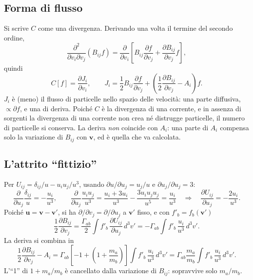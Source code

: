 \subsection{Forma di flusso}
Si scrive $C$ come una divergenza. Derivando una volta il termine del secondo ordine,
\begin{equation}
\frac{\partial^2}{\partial v_i\partial v_j}\left(B_{ij}f\right)=\frac{\partial}{\partial v_i}\left[B_{ij}\frac{\partial f}{\partial v_j}+\frac{\partial B_{ij}}{\partial v_j}f\right],
\end{equation}
quindi
\begin{equation}
C[f]=\frac{\partial J_i}{\partial v_i},\qquad J_i=\frac12B_{ij}\frac{\partial f}{\partial v_j}+\left(\frac12\frac{\partial B_{ij}}{\partial v_j}-A_i\right)f .
\end{equation}
$J_i$ è (meno) il flusso di particelle nello spazio delle velocità: una parte diffusiva, $\propto\partial f$, e una di deriva. Poiché $C$ è la divergenza di una corrente, e in assenza di sorgenti la divergenza di una corrente non crea né distrugge particelle, il numero di particelle si conserva. La deriva \emph{non} coincide con $A_i$: una parte di $A_i$ compensa solo la variazione di $B_{ij}$ con $\mathbf{v}$, ed è quella che va calcolata.

\subsection{L'attrito ``fittizio''}
Per $U_{ij}=\delta_{ij}/u-u_iu_j/u^3$, usando $\partial u/\partial u_j=u_j/u$ e $\partial u_j/\partial u_j=3$:
\begin{equation}
\frac{\partial}{\partial u_j}\frac{\delta_{ij}}{u}=-\frac{u_i}{u^3},\qquad
\frac{\partial}{\partial u_j}\frac{u_iu_j}{u^3}=\frac{u_i+3u_i}{u^3}-\frac{3u_iu_ju_j}{u^5}=\frac{u_i}{u^3}\quad\Rightarrow\quad\frac{\partial U_{ij}}{\partial u_j}=-\frac{2u_i}{u^3}.
\end{equation}
Poiché $\mathbf{u}=\mathbf{v}-\mathbf{v}'$, si ha $\partial/\partial v_j=\partial/\partial u_j$ a $\mathbf{v}'$ fisso, e con $f'_b=f_b(\mathbf{v}')$
\begin{equation}
\frac12\frac{\partial B_{ij}}{\partial v_j}=\frac{\Gamma_{ab}}{2}\int f'_b\,\frac{\partial U_{ij}}{\partial u_j}\,d^3v'=-\Gamma_{ab}\int f'_b\,\frac{u_i}{u^3}\,d^3v'.
\end{equation}
La deriva si combina in
\begin{equation}
\frac12\frac{\partial B_{ij}}{\partial v_j}-A_i=\Gamma_{ab}\left[-1+\left(1+\frac{m_a}{m_b}\right)\right]\int f'_b\,\frac{u_i}{u^3}\,d^3v'=\Gamma_{ab}\frac{m_a}{m_b}\int f'_b\,\frac{u_i}{u^3}\,d^3v'.
\end{equation}
L'``1'' di $1+m_a/m_b$ è cancellato dalla variazione di $B_{ij}$: sopravvive solo $m_a/m_b$.

